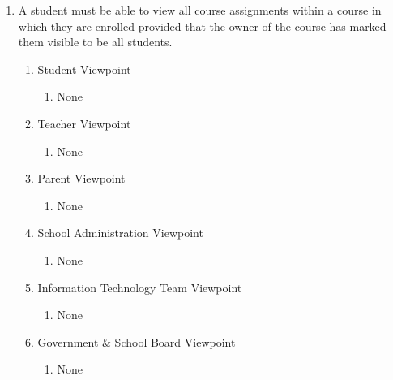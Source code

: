 \documentclass[]{article}
\begin{document}
\begin{enumerate}[{BE}1.]
	\item A student must be able to view all course assignments within a course in which they are enrolled provided that the owner of the course has marked them visible to be all students.
	\begin{enumerate}[{VP2}.1]
		\item Student Viewpoint
			\begin{enumerate}
				\item None
			\end{enumerate}
		\item Teacher Viewpoint
			\begin{enumerate}
				\item None
			\end{enumerate}
		\item Parent Viewpoint
			\begin{enumerate}
				\item None
			\end{enumerate}
		\item School Administration Viewpoint
			\begin{enumerate}
				\item None
			\end{enumerate}
		\item Information Technology Team Viewpoint
			\begin{enumerate}
				\item None
			\end{enumerate}
		\item Government \& School Board Viewpoint
			\begin{enumerate}
				\item None
			\end{enumerate}
	\end{enumerate}



\end{enumerate}
\end{document}
